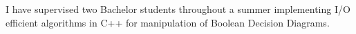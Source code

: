 I have supervised two Bachelor students throughout a summer implementing I/O
efficient algorithms in C++ for manipulation of Boolean Decision
Diagrams.